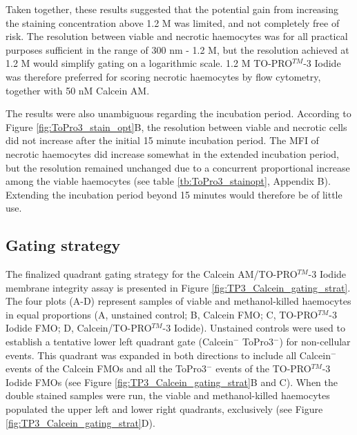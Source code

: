 Taken together, these results suggested that the potential gain from increasing the staining concentration above 1.2 \micro M was limited, and not completely free of risk. The resolution between viable and necrotic haemocytes was for all practical purposes sufficient in the range of 300 nm - 1.2 \micro M, but the resolution achieved at 1.2 \micro M would simplify gating on a logarithmic scale. 1.2 \micro M TO-PRO$^{TM}$-3 Iodide was therefore preferred for scoring necrotic haemocytes by flow cytometry, together with 50 nM Calcein AM.

The results were also unambiguous regarding the incubation period. According to Figure \ref{fig:ToPro3_stain_opt}B, the resolution between viable and necrotic cells did not increase after the initial 15 minute incubation period. The MFI of necrotic haemocytes did increase somewhat in the extended incubation period, but the resolution remained unchanged due to a concurrent proportional increase among the viable haemocytes (see table \ref{tb:ToPro3_stainopt}, Appendix B). Extending the incubation period beyond 15 minutes would therefore be of little use.

\subsection{Gating strategy}
The finalized quadrant gating strategy for the Calcein AM/TO-PRO$^{TM}$-3 Iodide membrane integrity assay is presented in Figure \ref{fig:TP3_Calcein_gating_strat}. The four plots (A-D) represent samples of viable and methanol-killed haemocytes in equal proportions (A, unstained control; B, Calcein FMO; C, TO-PRO$^{TM}$-3 Iodide FMO; D, Calcein/TO-PRO$^{TM}$-3 Iodide). Unstained controls were used to establish a tentative lower left quadrant gate (Calcein$^{-}$ ToPro3$^{-}$) for non-cellular events. This quadrant was expanded in both directions to include all Calcein$^{-}$ events of the Calcein FMOs and all the ToPro3$^{-}$ events of the TO-PRO$^{TM}$-3 Iodide FMOs (see Figure \ref{fig:TP3_Calcein_gating_strat}B and C). When the double stained samples were run, the viable and methanol-killed haemocytes populated the upper left and lower right quadrants, exclusively (see Figure \ref{fig:TP3_Calcein_gating_strat}D).

